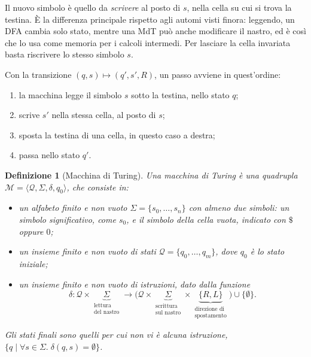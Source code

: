 \documentclass[a4paper, 11pt, oneside]{book}
\theoremstyle{formale}
\newtheorem*{definition}{Definizione}
\begin{document}
    Il nuovo simbolo \`e quello da \emph{scrivere} al posto di $s$, nella cella su cui si
    trova la testina. \`E la differenza principale rispetto agli automi visti finora:
    leggendo, un DFA cambia solo stato, mentre una MdT pu\`o anche modificare il nastro,
    ed \`e cos\`i che lo usa come memoria per i calcoli intermedi. Per lasciare la cella
    invariata basta riscrivere lo stesso simbolo $s$.

    Con la transizione $(q, s) \mapsto (q', s', R)$, un passo avviene in quest'ordine:
    \begin{enumerate}
        \item la macchina legge il simbolo $s$ sotto la testina, nello stato $q$;
        \item scrive $s'$ nella stessa cella, al posto di $s$;
        \item sposta la testina di una cella, in questo caso a destra;
        \item passa nello stato $q'$.
    \end{enumerate}

    \begin{definition}[Macchina di Turing]
        Una macchina di Turing \`e una quadrupla
        $\mathcal{M} = \langle \mathcal{Q}, \Sigma, \delta, q_0 \rangle$, che consiste in:
        \begin{itemize}
            \item un alfabeto finito e non vuoto $\Sigma = \{s_0, \dots, s_n\}$ con almeno
                due simboli: un simbolo significativo, come $s_0$, e il simbolo della
                cella vuota, indicato con $\$$ oppure $0$;
            \item un insieme finito e non vuoto di stati $\mathcal{Q} = \{q_0, \dots, q_m\}$, dove
                $q_0$ \`e lo stato iniziale;
            \item un insieme finito e non vuoto di istruzioni, dato dalla funzione
                \begin{equation*}
                    \delta \colon \mathcal{Q} \times
                    \underbrace{\Sigma}_{\substack{\text{lettura}\\ \text{del nastro}}}
                    \to
                    \bigl(\mathcal{Q} \times
                    \underbrace{\Sigma}_{\substack{\text{scrittura}\\ \text{sul nastro}}}
                    \times
                    \underbrace{\{R, L\}}_{\substack{\text{direzione di}\\
                    \text{spostamento}}}\bigr) \cup \{\emptyset\}.
                \end{equation*}
        \end{itemize}
        Gli stati finali sono quelli per cui non vi \`e alcuna istruzione,
        $\{q \mid \forall s \in \Sigma.\; \delta(q, s) = \emptyset\}$.
    \end{definition}
\end{document}
